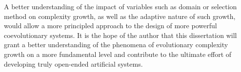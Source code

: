 \documentclass{article}
\begin{document}
A better understanding of the impact of variables such as domain or selection method on complexity growth, 
as well as the adaptive nature of such growth, would allow a more principled approach
to the design of more powerful coevolutionary systems. It is the hope of the author that this
dissertation will grant a better understanding of the phenomena of evolutionary complexity growth on a more 
fundamental level and contribute to the ultimate effort of developing truly open-ended artificial
systems.



\end{document}
